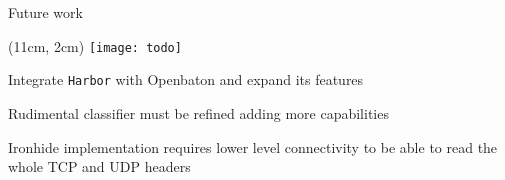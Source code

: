 \begin{frame}{Future work}

  \begin{textblock*}{1cm}(11cm, 2cm)
    \texttt{[image: todo]}
  \end{textblock*}

  Integrate \texttt{Harbor} with Openbaton and expand its features

  \vfill{}

  Rudimental classifier must be refined adding more capabilities

  \vfill{}

  Ironhide implementation requires lower level connectivity to be able to read
  the whole TCP and UDP headers

  \vfill{}

\end{frame}